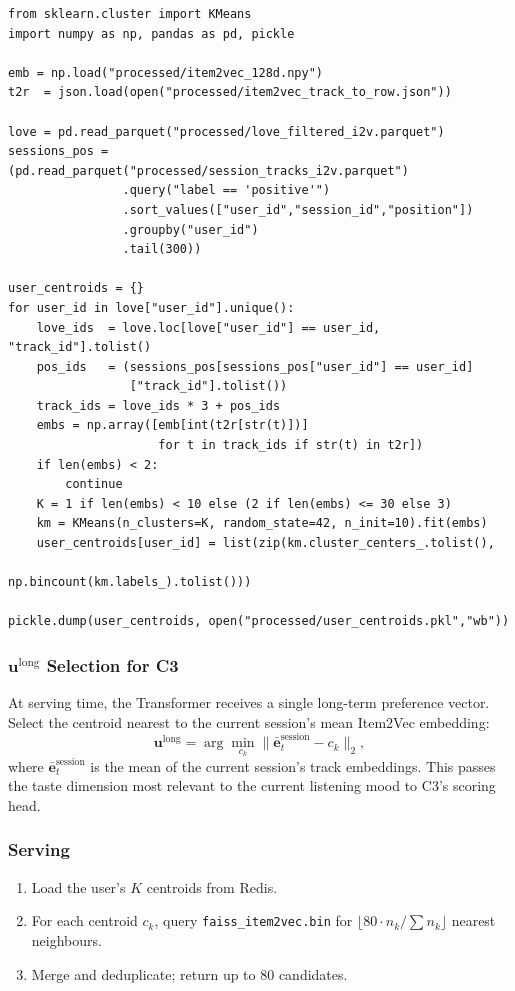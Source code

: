 \documentclass[11pt]{article}
\begin{document}
\begin{lstlisting}
from sklearn.cluster import KMeans
import numpy as np, pandas as pd, pickle

emb = np.load("processed/item2vec_128d.npy")
t2r  = json.load(open("processed/item2vec_track_to_row.json"))

love = pd.read_parquet("processed/love_filtered_i2v.parquet")
sessions_pos = (pd.read_parquet("processed/session_tracks_i2v.parquet")
                .query("label == 'positive'")
                .sort_values(["user_id","session_id","position"])
                .groupby("user_id")
                .tail(300))

user_centroids = {}
for user_id in love["user_id"].unique():
    love_ids  = love.loc[love["user_id"] == user_id, "track_id"].tolist()
    pos_ids   = (sessions_pos[sessions_pos["user_id"] == user_id]
                 ["track_id"].tolist())
    track_ids = love_ids * 3 + pos_ids
    embs = np.array([emb[int(t2r[str(t)])]
                     for t in track_ids if str(t) in t2r])
    if len(embs) < 2:
        continue
    K = 1 if len(embs) < 10 else (2 if len(embs) <= 30 else 3)
    km = KMeans(n_clusters=K, random_state=42, n_init=10).fit(embs)
    user_centroids[user_id] = list(zip(km.cluster_centers_.tolist(),
                                       np.bincount(km.labels_).tolist()))

pickle.dump(user_centroids, open("processed/user_centroids.pkl","wb"))
\end{lstlisting}

\subsubsection{$\mathbf{u}^{\text{long}}$ Selection for C3}

At serving time, the Transformer receives a single long-term preference
vector. Select the centroid nearest to the current session's mean
Item2Vec embedding:
\[
  \mathbf{u}^{\text{long}}
  = \arg\min_{c_k}
    \bigl\| \bar{\mathbf{e}}^{\text{session}}_t - c_k \bigr\|_2,
\]
where $\bar{\mathbf{e}}^{\text{session}}_t$ is the mean of the current
session's track embeddings. This passes the taste dimension most
relevant to the current listening mood to C3's scoring head.

\subsubsection{Serving}

\begin{enumerate}
  \item Load the user's $K$ centroids from Redis.
  \item For each centroid $c_k$, query \texttt{faiss\_item2vec.bin}
        for $\lfloor 80 \cdot n_k / \sum n_k \rfloor$ nearest neighbours.
  \item Merge and deduplicate; return up to 80 candidates.
\end{enumerate}
\end{document}
